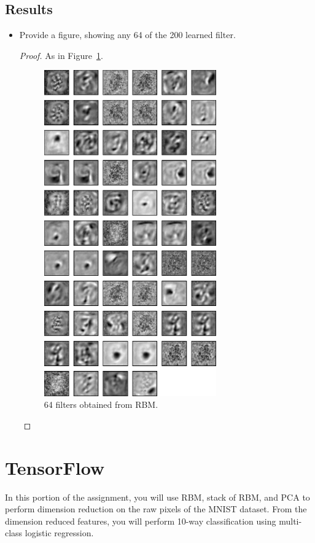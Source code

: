 \documentclass[12pt]{article}
\newcommand{\1}{\mathbf{1}}
\begin{document}
{\subsection{Results}
\begin{itemize}
  \item Provide a figure, showing any 64 of the 200 learned filter.
  \begin{proof}
    As in Figure~\ref{fig:part2}.
    \begin{figure}
      \centering
      \includegraphics[width=0.7\textwidth]{../figures/part2-filters.pdf}
      \caption{64 filters obtained from RBM.\label{fig:part2}}
    \end{figure}
  \end{proof}
\end{itemize}


\section{TensorFlow}
In this portion of the assignment, you will use RBM, stack of RBM, and PCA to perform dimension reduction on the raw pixels of the MNIST dataset. From the dimension reduced features, you will perform 10-way classification using multi-class logistic regression. 

}
\end{document}
